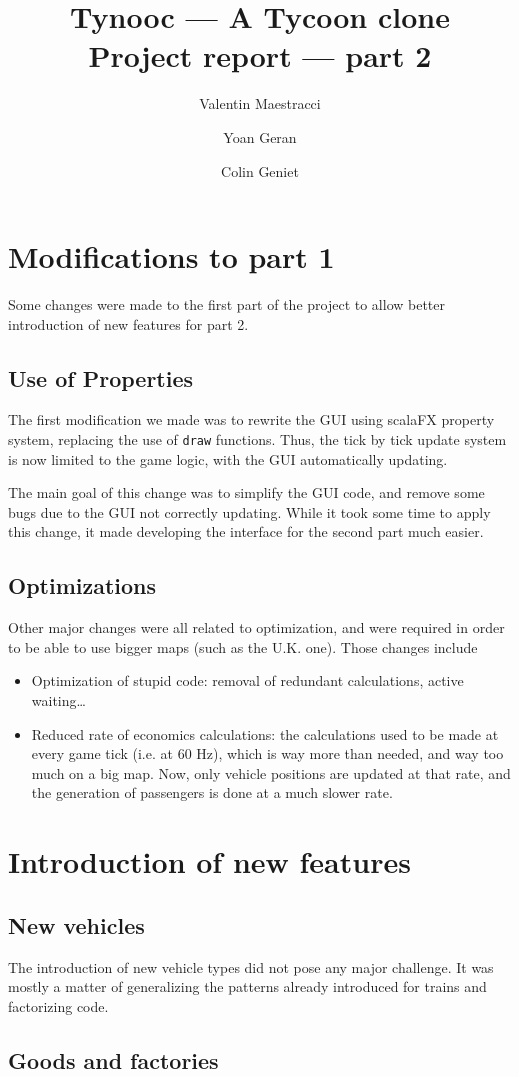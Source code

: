 \documentclass{article}
\begin{document}
\title{Tynooc --- A Tycoon clone \\ \large{Project report --- part 2}}
\author{Valentin Maestracci \and Yoan Geran \and Colin Geniet}
\maketitle

\tableofcontents

\section{Modifications to part 1}
Some changes were made to the first part of the project to allow better introduction of new features for part 2.

\subsection{Use of Properties}
The first modification we made was to rewrite the GUI using scalaFX property system,
replacing the use of \verb|draw| functions.
Thus, the tick by tick update system is now limited to the game logic, with the GUI automatically updating.

The main goal of this change was to simplify the GUI code, and remove some bugs due to the GUI
not correctly updating. While it took some time to apply this change, it made developing the interface
for the second part much easier.

\subsection{Optimizations}
Other major changes were all related to optimization, and were required in order to be able to use
bigger maps (such as the U.K. one). Those changes include
\begin{itemize}
\item Optimization of stupid code: removal of redundant calculations, active waiting\dots
\item Reduced rate of economics calculations: the calculations used to be made at every game tick (i.e. at 60 Hz),
which is way more than needed, and way too much on a big map.
Now, only vehicle positions are updated at that rate, and the generation of passengers is done at a much slower rate.
\end{itemize}


\section{Introduction of new features}
\subsection{New vehicles}
The introduction of new vehicle types did not pose any major challenge.
It was mostly a matter of generalizing the patterns already introduced for trains
and factorizing code.

\subsection{Goods and factories} 
\end{document}

